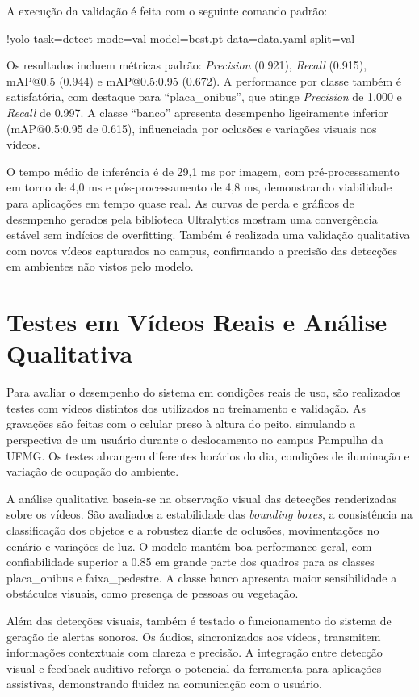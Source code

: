 A execução da validação é feita com o seguinte comando padrão:

!yolo task=detect mode=val model=best.pt data=data.yaml split=val

Os resultados incluem métricas padrão: \textit{Precision} (0.921), \textit{Recall} (0.915), mAP@0.5 (0.944) e mAP@0.5:0.95 (0.672). A performance por classe também é satisfatória, com destaque para “placa\_onibus”, que atinge \textit{Precision} de 1.000 e \textit{Recall} de 0.997. A classe “banco” apresenta desempenho ligeiramente inferior (mAP@0.5:0.95 de 0.615), influenciada por oclusões e variações visuais nos vídeos.

O tempo médio de inferência é de 29,1 ms por imagem, com pré-processamento em torno de 4,0 ms e pós-processamento de 4,8 ms, demonstrando viabilidade para aplicações em tempo quase real. As curvas de perda e gráficos de desempenho gerados pela biblioteca Ultralytics mostram uma convergência estável sem indícios de overfitting. Também é realizada uma validação qualitativa com novos vídeos capturados no campus, confirmando a precisão das detecções em ambientes não vistos pelo modelo.

\section{\textbf{Testes em Vídeos Reais e Análise Qualitativa}}

Para avaliar o desempenho do sistema em condições reais de uso, são realizados testes com vídeos distintos dos utilizados no treinamento e validação. As gravações são feitas com o celular preso à altura do peito, simulando a perspectiva de um usuário durante o deslocamento no campus Pampulha da UFMG. Os testes abrangem diferentes horários do dia, condições de iluminação e variação de ocupação do ambiente.

A análise qualitativa baseia-se na observação visual das detecções renderizadas sobre os vídeos. São avaliados a estabilidade das \textit{bounding boxes}, a consistência na classificação dos objetos e a robustez diante de oclusões, movimentações no cenário e variações de luz. O modelo mantém boa performance geral, com confiabilidade superior a 0.85 em grande parte dos quadros para as classes placa\_onibus e faixa\_pedestre. A classe banco apresenta maior sensibilidade a obstáculos visuais, como presença de pessoas ou vegetação.

Além das detecções visuais, também é testado o funcionamento do sistema de geração de alertas sonoros. Os áudios, sincronizados aos vídeos, transmitem informações contextuais com clareza e precisão. A integração entre detecção visual e feedback auditivo reforça o potencial da ferramenta para aplicações assistivas, demonstrando fluidez na comunicação com o usuário.

